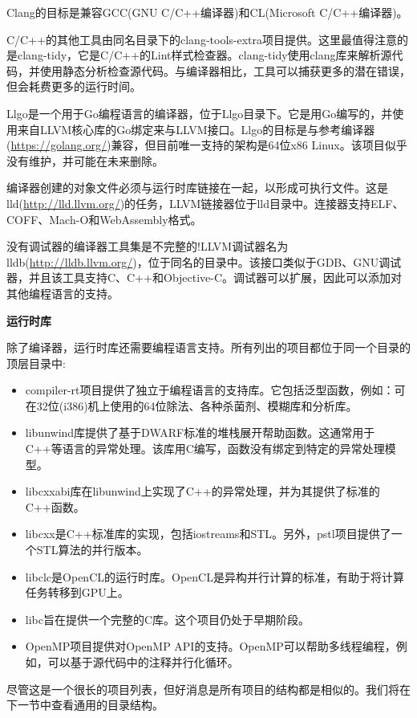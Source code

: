 Clang的目标是兼容GCC(GNU C/C++编译器)和CL(Microsoft C/C++编译器)。\par

C/C++的其他工具由同名目录下的clang-tools-extra项目提供。这里最值得注意的是clang-tidy，它是C/C++的Lint样式检查器。clang-tidy使用clang库来解析源代码，并使用静态分析检查源代码。与编译器相比，工具可以捕获更多的潜在错误，但会耗费更多的运行时间。\par

Llgo是一个用于Go编程语言的编译器，位于Llgo目录下。它是用Go编写的，并使用来自LLVM核心库的Go绑定来与LLVM接口。Llgo的目标是与参考编译器(\url{https://golang.org/})兼容，但目前唯一支持的架构是64位x86 Linux。该项目似乎没有维护，并可能在未来删除。\par

编译器创建的对象文件必须与运行时库链接在一起，以形成可执行文件。这是lld(\url{http://lld.llvm.org/})的任务，LLVM链接器位于lld目录中。连接器支持ELF、COFF、Mach-O和WebAssembly格式。\par

没有调试器的编译器工具集是不完整的!LLVM调试器名为lldb(\url{http://lldb.llvm.org/})，位于同名的目录中。该接口类似于GDB、GNU调试器，并且该工具支持C、C++和Objective-C。调试器可以扩展，因此可以添加对其他编程语言的支持。\par

\hspace*{\fill} \par %
\textbf{运行时库}

除了编译器，运行时库还需要编程语言支持。所有列出的项目都位于同一个目录的顶层目录中:\par

\begin{itemize}
	\item compiler-rt项目提供了独立于编程语言的支持库。它包括泛型函数，例如：可在32位(i386)机上使用的64位除法、各种杀菌剂、模糊库和分析库。
	\item libunwind库提供了基于DWARF标准的堆栈展开帮助函数。这通常用于C++等语言的异常处理。该库用C编写，函数没有绑定到特定的异常处理模型。
	\item libcxxabi库在libunwind上实现了C++的异常处理，并为其提供了标准的C++函数。
	\item libcxx是C++标准库的实现，包括iostreams和STL。另外，pstl项目提供了一个STL算法的并行版本。
	\item libclc是OpenCL的运行时库。OpenCL是异构并行计算的标准，有助于将计算任务转移到GPU上。
	\item libc旨在提供一个完整的C库。这个项目仍处于早期阶段。
	\item OpenMP项目提供对OpenMP API的支持。OpenMP可以帮助多线程编程，例如，可以基于源代码中的注释并行化循环。
\end{itemize}

尽管这是一个很长的项目列表，但好消息是所有项目的结构都是相似的。我们将在下一节中查看通用的目录结构。\par








